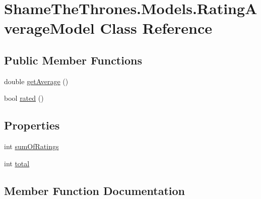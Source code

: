 \hypertarget{class_shame_the_thrones_1_1_models_1_1_rating_average_model}{}\section{Shame\+The\+Thrones.\+Models.\+Rating\+Average\+Model Class Reference}
\label{class_shame_the_thrones_1_1_models_1_1_rating_average_model}
\subsection*{Public Member Functions}
\begin{DoxyCompactItemize}
\item 
double \hyperlink{class_shame_the_thrones_1_1_models_1_1_rating_average_model_a8cf04373e2d9521692030d3a009f9212}{get\+Average} ()
\item 
bool \hyperlink{class_shame_the_thrones_1_1_models_1_1_rating_average_model_a99150c5f4b89d4e1895be099d1138d47}{rated} ()
\end{DoxyCompactItemize}
\subsection*{Properties}
\begin{DoxyCompactItemize}
\item 
int \hyperlink{class_shame_the_thrones_1_1_models_1_1_rating_average_model_ad2fa1f955c4057054c7c53670ae9647c}{sum\+Of\+Ratings}
\item 
int \hyperlink{class_shame_the_thrones_1_1_models_1_1_rating_average_model_ac6c3c1cc691f6cb5d0362a598e78a426}{total}
\end{DoxyCompactItemize}


\subsection{Member Function Documentation}
